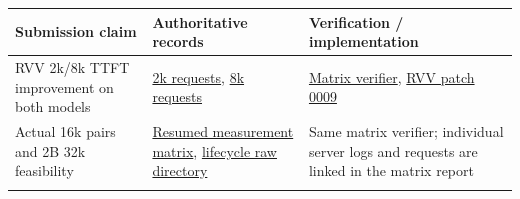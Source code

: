 \documentclass[10pt,a4paper]{article}
\begin{document}
\begin{longtable}[]{@{}lll@{}}
\toprule
\begin{minipage}[b]{0.30\columnwidth}\raggedright
Submission claim\strut
\end{minipage} & \begin{minipage}[b]{0.30\columnwidth}\raggedright
Authoritative records\strut
\end{minipage} & \begin{minipage}[b]{0.30\columnwidth}\raggedright
Verification / implementation\strut
\end{minipage}\tabularnewline
\midrule
\endhead
\begin{minipage}[t]{0.30\columnwidth}\raggedright
RVV 2k/8k TTFT improvement on both models\strut
\end{minipage} & \begin{minipage}[t]{0.30\columnwidth}\raggedright
\href{https://github.com/MoyaMryia/riscv-accl/blob/main/spacemit/reports/raw/2026-09-25-lifecycle/lifecycle-rvv32.jsonl}{2k
requests},
\href{https://github.com/MoyaMryia/riscv-accl/blob/main/spacemit/reports/raw/2026-09-25-lifecycle/lifecycle-rvv32-long.jsonl}{8k
requests}\strut
\end{minipage} & \begin{minipage}[t]{0.30\columnwidth}\raggedright
\href{https://github.com/MoyaMryia/riscv-accl/blob/main/spacemit/bench/verify-results-matrix.py}{Matrix
verifier},
\href{https://github.com/MoyaMryia/riscv-accl/blob/main/spacemit/patches/0009-wide-rvv-vlen256.patch}{RVV
patch 0009}\strut
\end{minipage}\tabularnewline
\begin{minipage}[t]{0.30\columnwidth}\raggedright
Actual 16k pairs and 2B 32k feasibility\strut
\end{minipage} & \begin{minipage}[t]{0.30\columnwidth}\raggedright
\href{https://github.com/MoyaMryia/riscv-accl/blob/main/spacemit/reports/2026-09-27-resumed-measures.md}{Resumed
measurement matrix},
\href{https://github.com/MoyaMryia/riscv-accl/blob/main/spacemit/reports/raw/2026-09-25-lifecycle}{lifecycle
raw directory}\strut
\end{minipage} & \begin{minipage}[t]{0.30\columnwidth}\raggedright
Same matrix verifier; individual server logs and requests are linked in
the matrix report\strut
\end{minipage}\tabularnewline
\begin{minipage}[t]{0.30\columnwidth}\raggedright

\end{minipage}
\end{longtable}
\end{document}
